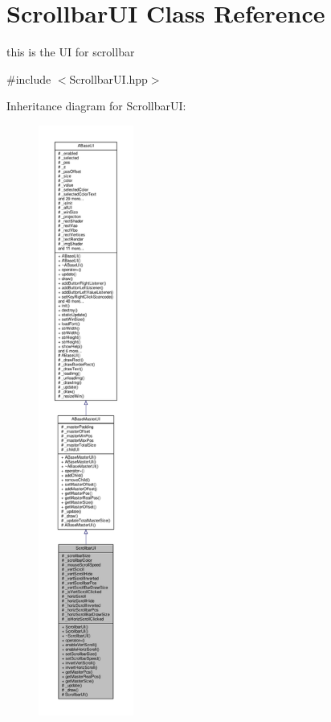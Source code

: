 \hypertarget{class_scrollbar_u_i}{}\section{Scrollbar\+UI Class Reference}
\label{class_scrollbar_u_i}


this is the UI for scrollbar  




{\ttfamily \#include $<$Scrollbar\+U\+I.\+hpp$>$}



Inheritance diagram for Scrollbar\+UI\+:
\nopagebreak
\begin{figure}[H]
\begin{center}
\leavevmode
\includegraphics[height=550pt]{class_scrollbar_u_i__inherit__graph}
\end{center}
\end{figure}


